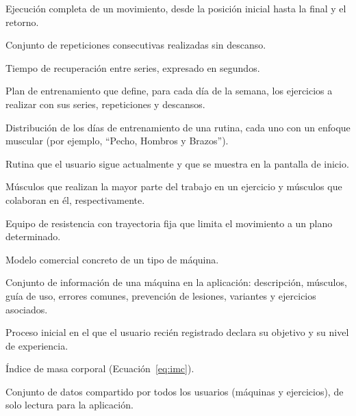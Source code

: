 \begin{description}[style=nextline, leftmargin=0.6cm, font=\normalfont\bfseries]
  \item[Repetición] Ejecución completa de un movimiento, desde la posición
  inicial hasta la final y el retorno.
  \item[Serie] Conjunto de repeticiones consecutivas realizadas sin descanso.
  \item[Descanso] Tiempo de recuperación entre series, expresado en segundos.
  \item[Rutina] Plan de entrenamiento que define, para cada día de la semana,
  los ejercicios a realizar con sus series, repeticiones y descansos.
  \item[Plan semanal] Distribución de los días de entrenamiento de una rutina,
  cada uno con un enfoque muscular (por ejemplo, ``Pecho, Hombros y Brazos'').
  \item[Rutina activa] Rutina que el usuario sigue actualmente y que se muestra
  en la pantalla de inicio.
  \item[Grupo muscular principal y secundario] Músculos que realizan la mayor
  parte del trabajo en un ejercicio y músculos que colaboran en él,
  respectivamente.
  \item[Máquina guiada] Equipo de resistencia con trayectoria fija que limita
  el movimiento a un plano determinado.
  \item[Variante] Modelo comercial concreto de un tipo de máquina.
  \item[Ficha de máquina] Conjunto de información de una máquina en la
  aplicación: descripción, músculos, guía de uso, errores comunes, prevención
  de lesiones, variantes y ejercicios asociados.
  \item[Onboarding] Proceso inicial en el que el usuario recién registrado
  declara su objetivo y su nivel de experiencia.
  \item[IMC] Índice de masa corporal (Ecuación~\ref{eq:imc}).
  \item[Catálogo] Conjunto de datos compartido por todos los usuarios (máquinas
  y ejercicios), de solo lectura para la aplicación.
\end{description}
